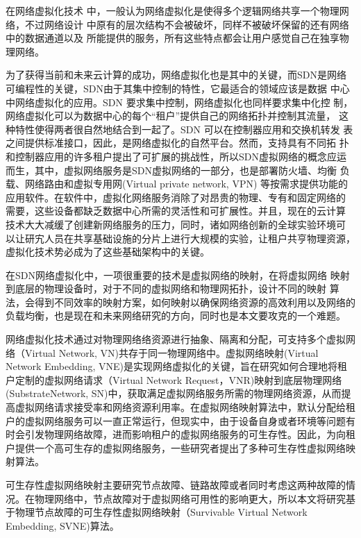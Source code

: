 在网络虚拟化技术 中，一般认为网络虚拟化是使得多个逻辑网络共享一个物理网络，不过网络设计 中原有的层次结构不会被破坏，同样不被破坏保留的还有网络中的数据通道以及 所能提供的服务，所有这些特点都会让用户感觉自己在独享物理网络。

为了获得当前和未来云计算的成功，网络虚拟化也是其中的关键，而SDN是网络可编程性的关键，SDN由于其集中控制的特性，它最适合的领域应该是数据 中心中网络虚拟化的应用。SDN 要求集中控制，网络虚拟化也同样要求集中化控 制，网络虚拟化可以为数据中心的每个“租户”提供自己的网络拓扑并控制其流量， 这种特性使得两者很自然地结合到一起了。SDN 可以在控制器应用和交换机转发 表之间提供标准接口，因此，是网络虚拟化的自然平台。然而，支持具有不同拓 扑和控制器应用的许多租户提出了可扩展的挑战性，所以SDN虚拟网络的概念应运而生，其中，虚拟网络服务是SDN虚拟网络的一部分，也是部署防火墙、均衡 负载、网络路由和虚拟专用网(Virtual private network, VPN) 等按需求提供功能的 应用软件。在软件中，虚拟化网络服务消除了对昂贵的物理、专有和固定网络的 需要，这些设备都缺乏数据中心所需的灵活性和可扩展性。并且，现在的云计算 技术大大减缓了创建新网络服务的压力，同时，诸如网络创新的全球实验环境可 以让研宄人员在共享基础设施的分片上进行大规模的实验，让租户共亨物理资源， 虚拟化技术势必成为了这些基础架构中的关键。

在SDN网络虚拟化中，一项很重要的技术是虚拟网络的映射，在将虚拟网络 映射到底层的物理设备时，对于不同的虚拟网络和物理网拓扑，设计不同的映射 算法，会得到不同效率的映射方案，如何映射以确保网络资源的高效利用以及网络的负载均衡，也是现在和未来网络研究的方向，同时也是本文要攻克的一个难题。

网络虚拟化\cite{chowdhury2009network}技术通过对物理网络络资源进行抽象、隔离和分配，可支持多个虚拟网络（Virtual Network, VN)共存于同一物理网络中。虚拟网络映射\cite{fischer2013virtual}(Virtual Network Embedding, VNE)是实现网络虚拟化的关键，旨在研究如何合理地将租户定制的虚拟网络请求（Virtual Network Request，VNR)映射到底层物理网络 (SubstrateNetwork, SN)中，获取满足虚拟网络服务所需的物理网络资源，从而提高虚拟网络请求接受率和网络资源利用率。在虚拟网络映射算法\cite{6,8}中，默认分配给租户的虚拟网络服务可以一直正常运行，但现实中，由于设备自身或者环境等问题有时会引发物理网络故障，进而影响租户的虚拟网络服务的可生存性。因此，为向租户提供一个高可生存的虚拟网络服务，一些研究者提出了多种可生存性虚拟网络映射算法\cite{herker2013survey}。

可生存性虚拟网络映射主要研究节点故障、链路故障或者同时考虑这两种故障的情况。在物理网络中，节点故障对于虚拟网络可用性的影响更大，所以本文将研究基于物理节点故障的可生存性虚拟网络映射（Survivable Virtual Network Embedding, SVNE)算法。

